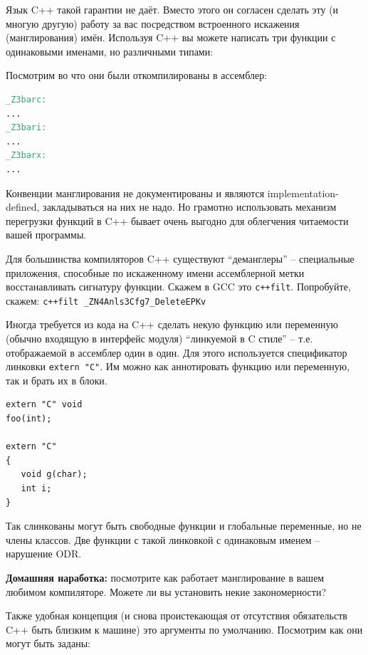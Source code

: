 \documentclass[a4paper,12pt,oneside]{article}
\begin{document}
Язык C++ такой гарантии не даёт. Вместо этого он согласен сделать эту (и многую другую) работу за вас посредством встроенного искажения (манглирования) имён. Используя C++ вы можете написать три функции с одинаковыми именами, но различными типами:



Посмотрим во что они были откомпилированы в ассемблер:

\begin{lstlisting}[language=make]
_Z3barc:
...
_Z3bari:
...
_Z3barx:
...
\end{lstlisting}

Конвенции манглирования не документированы и являются implementation-defined, закладываться на них не надо. Но грамотно использовать механизм перегрузки функций в C++ бывает очень выгодно для облегчения читаемости вашей программы.

Для большинства компиляторов C++ существуют ``деманглеры'' -- специальные приложения, способные по искаженному имени ассемблерной метки восстанавливать сигнатуру функции. Скажем в GCC это \lstinline!c++filt!. Попробуйте, скажем: \lstinline!c++filt _ZN4Anls3Cfg7_DeleteEPKv!

Иногда требуется из кода на C++ сделать некую функцию или переменную (обычно входящую в интерфейс модуля) ``линкуемой в C стиле'' -- т.е. отображаемой в ассемблер один в один. Для этого используется спецификатор линковки \lstinline!extern "C"!. Им можно как аннотировать функцию или переменную, так и брать их в блоки.

\begin{lstlisting}
extern "C" void 
foo(int);

extern "C"
{
   void g(char);
   int i;
}
\end{lstlisting}

Так слинкованы могут быть свободные функции и глобальные переменные, но не члены классов. Две функции с такой линковкой с одинаковым именем -- нарушение ODR.

\textbf{Домашняя наработка:} посмотрите как работает манглирование в вашем любимом компиляторе. Можете ли вы установить некие закономерности?

Также удобная концепция (и снова проистекающая от отсутствия обязательств C++ быть близким к машине) это аргументы по умолчанию. Посмотрим как они могут быть заданы:


\end{document}
